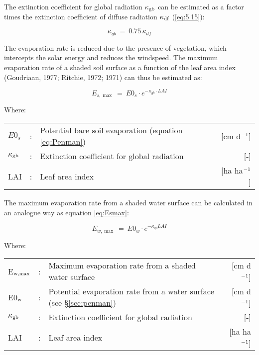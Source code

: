 The extinction coefficient for global radiation $\kappa$$_{{\rm gb}}$ can be estimated as a factor times the extinction coefficient of diffuse radiation $\kappa_{{\rm df}}$ (\ref{eq:5.15}):

\begin{equation}
\label{eq:6.5}
\kappa_{gb} ~=~ 0.75\, \kappa_{df} 
\end{equation}

The evaporation rate is reduced due to the presence of vegetation, which intercepts the solar energy and reduces the windspeed. The maximum evaporation rate of a shaded soil surface as a function of the leaf area index (Goudriaan, 1977; Ritchie, 1972; 1971) can thus be estimated as:

\begin{equation}
\label{eq:Esmax}
E_{s,\max} ~=~ E0_{s} \cdot e^{-\kappa_{gb} \cdot LAI}
\end{equation}

Where:\\[5pt]
\begin{tabularx}{\textwidth}{llXr}
	$E0_{s}$ &:& Potential bare soil evaporation (equation \ref{eq:Penman}) & [cm d$^{{\rm -1}}$]\\
	$\kappa$$_{{\rm gb}}$ &:& Extinction coefficient for global radiation  & [-]\\
	LAI &:& Leaf area index  & [ha ha$^{{\rm -1}}$]\\
\end{tabularx}

The maximum evaporation rate from a shaded water surface can be calculated in an analogue way as equation \ref{eq:Esmax}: 

\begin{equation}
\label{eq:Ewmax}
E_{w,\max } ~=~ E0_{w} \cdot e^{-\kappa_{gb} LAI}
\end{equation}

Where:\\[5pt]
\begin{tabularx}{\textwidth}{llXr}
	E$_{{\rm w,max}}$ &:& Maximum evaporation rate from a shaded water surface & 
	[cm d$^{{\rm -1}}$]\\
	E0$_{{\rm w}}$ &:& Potential evaporation rate from a water surface 
	(see \S \ref{sec:penman}) & [cm d$^{{\rm -1}}$]\\
	$\kappa$$_{{\rm gb}}$ &:& Extinction coefficient for global radiation & [-]\\
	LAI &:& Leaf area index & [ha ha$^{{\rm -1}}$]\\
\end{tabularx}


